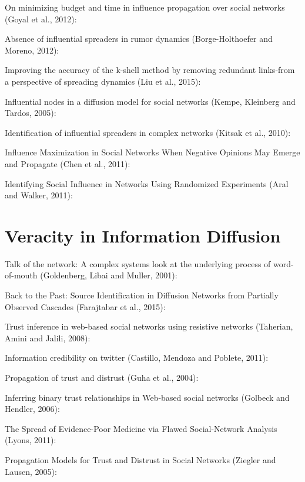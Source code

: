 On minimizing budget and time in influence propagation over social networks (Goyal et al., 2012):

Absence of influential spreaders in rumor dynamics (Borge-Holthoefer and Moreno, 2012):

Improving the accuracy of the k-shell method by removing redundant links-from a perspective of spreading dynamics (Liu et al., 2015):

Influential nodes in a diffusion model for social networks (Kempe, Kleinberg and Tardos, 2005):

Identification of influential spreaders in complex networks (Kitsak et al., 2010):

Influence Maximization in Social Networks When Negative Opinions May Emerge and Propagate (Chen et al., 2011):

Identifying Social Influence in Networks Using Randomized Experiments (Aral and Walker, 2011):


\section*{Veracity in Information Diffusion}

Talk of the network: A complex systems look at the underlying process of word-of-mouth (Goldenberg, Libai and Muller, 2001):

Back to the Past: Source Identification in Diffusion Networks from Partially Observed Cascades (Farajtabar et al., 2015):

Trust inference in web-based social networks using resistive networks (Taherian, Amini and Jalili, 2008):

Information credibility on twitter (Castillo, Mendoza and Poblete, 2011):

Propagation of trust and distrust (Guha et al., 2004):

Inferring binary trust relationships in Web-based social networks (Golbeck and Hendler, 2006):

The Spread of Evidence-Poor Medicine via Flawed Social-Network Analysis (Lyons, 2011):

Propagation Models for Trust and Distrust in Social Networks (Ziegler and Lausen, 2005):


